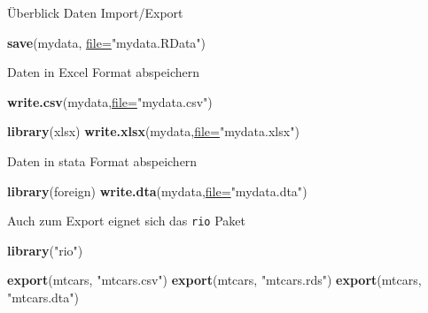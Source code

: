 \documentclass[
  ignorenonframetext,
]{beamer}
\newenvironment{Shaded}{\begin{snugshade}}{\end{snugshade}}
\newcommand{\DataTypeTok}[1]{\textcolor[rgb]{0.74,0.68,0.62}{\underline{#1}}}
\newcommand{\KeywordTok}[1]{\textcolor[rgb]{0.26,0.66,0.93}{\textbf{#1}}}
\newcommand{\NormalTok}[1]{\textcolor[rgb]{0.74,0.68,0.62}{#1}}
\newcommand{\StringTok}[1]{\textcolor[rgb]{0.02,0.61,0.04}{#1}}
\begin{document}
\begin{frame}[fragile]{Überblick Daten Import/Export}
\protect\hypertarget{uberblick-daten-importexport}{}

\begin{Shaded}
\begin{Highlighting}[]
\KeywordTok{save}\NormalTok{(mydata, }\DataTypeTok{file=}\StringTok{"mydata.RData"}\NormalTok{)}
\end{Highlighting}
\end{Shaded}

\end{frame}

\begin{frame}[fragile]{Daten in Excel Format abspeichern}
\protect\hypertarget{daten-in-excel-format-abspeichern}{}

\begin{Shaded}
\begin{Highlighting}[]
\KeywordTok{write.csv}\NormalTok{(mydata,}\DataTypeTok{file=}\StringTok{"mydata.csv"}\NormalTok{) }
\end{Highlighting}
\end{Shaded}

\begin{Shaded}
\begin{Highlighting}[]
\KeywordTok{library}\NormalTok{(xlsx)}
\KeywordTok{write.xlsx}\NormalTok{(mydata,}\DataTypeTok{file=}\StringTok{"mydata.xlsx"}\NormalTok{) }
\end{Highlighting}
\end{Shaded}

\end{frame}

\begin{frame}[fragile]{Daten in stata Format abspeichern}
\protect\hypertarget{daten-in-stata-format-abspeichern}{}

\begin{Shaded}
\begin{Highlighting}[]
\KeywordTok{library}\NormalTok{(foreign)}
\KeywordTok{write.dta}\NormalTok{(mydata,}\DataTypeTok{file=}\StringTok{"mydata.dta"}\NormalTok{) }
\end{Highlighting}
\end{Shaded}

\end{frame}

\begin{frame}[fragile]{Auch zum Export eignet sich das \texttt{rio}
Paket}
\protect\hypertarget{auch-zum-export-eignet-sich-das-rio-paket}{}

\begin{Shaded}
\begin{Highlighting}[]
\KeywordTok{library}\NormalTok{(}\StringTok{"rio"}\NormalTok{)}

\KeywordTok{export}\NormalTok{(mtcars, }\StringTok{"mtcars.csv"}\NormalTok{)}
\KeywordTok{export}\NormalTok{(mtcars, }\StringTok{"mtcars.rds"}\NormalTok{)}
\KeywordTok{export}\NormalTok{(mtcars, }\StringTok{"mtcars.dta"}\NormalTok{)}
\end{Highlighting}
\end{Shaded}

\end{frame}
\end{document}

